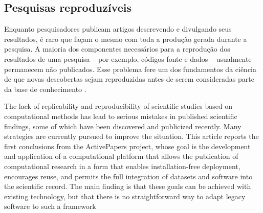 \subsection{Pesquisas reproduzíveis}



Enquanto pesquisadores publicam artigos descrevendo e divulgando seus
resultados, é raro que façam o mesmo com toda a produção gerada durante a
pesquisa. A maioria dos componentes necessários para a reprodução dos
resultados de uma pesquisa -- por exemplo, códigos fonte e dados -- usualmente
permanecem não publicados. Esse problema fere um dos fundamentos
da ciência de que novas descobertas sejam reproduzidas antes de serem
consideradas parte da base de conhecimento \cite{Stodden2009}.

The lack of replicability and reproducibility of scientific studies based on
computational methods has lead to serious mistakes in published scientific
findings, some of which have been discovered and publicized recently. Many
strategies are currently pursued to improve the situation. This article reports the
first conclusions from the ActivePapers project, whose goal is the development
and application of a computational platform that allows the publication of
computational research in a form that enables installation-free deployment,
encourages reuse, and permits the full integration of datasets and software into
the scientific record. The main finding is that these goals can be achieved with
existing technology, but that there is no straightforward way to adapt legacy
software to such a framework \cite{hinsen2014activepapers}

